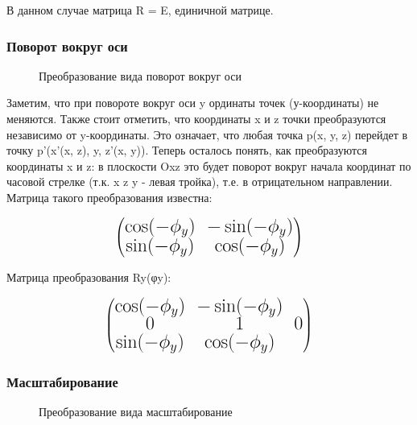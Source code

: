 В данном случае матрица R = E, единичной матрице.

\subsubsection{Поворот вокруг оси}
\begin{figure}[H]
	\caption{Преобразование вида поворот вокруг оси}
	\label{prim2:image}
\end{figure}

Заметим, что при повороте вокруг оси y ординаты точек (у-координаты) не меняются. Также стоит отметить, что координаты x и z точки преобразуются независимо от y-координаты. Это означает, что любая точка p(x, y, z) перейдет в точку p’(x’(x, z), y, z’(x, y)). Теперь осталось понять, как преобразуются координаты x и z: в плоскости Oxz это будет поворот вокруг начала координат по часовой стрелке (т.к. x z y - левая тройка), т.е. в отрицательном направлении. Матрица такого преобразования известна:

\begin{equation}
	\fontsize{17}{20}{
	\left(
	\begin{matrix}
		\cos (-\phi_{y}) & -\sin(-\phi_{y}) \\
		\sin (-\phi_{y}) & \cos (-\phi_{y})
	\end{matrix}
	\right)}
\end{equation}

\vspace*{5mm}Матрица преобразования Ry(φy):

\begin{equation}
	\fontsize{17}{20}{
		\left(
		\begin{matrix}
			\cos (-\phi_{y}) & -\sin(-\phi_{y}) \\
			0 & 1 & 0 \\
			\sin (-\phi_{y}) & \cos (-\phi_{y})
		\end{matrix}
		\right)}
\end{equation}

\subsubsection{Масштабирование}
\begin{figure}[H]
	\caption{Преобразование вида масштабирование}
	\label{prim3:image}
\end{figure}

